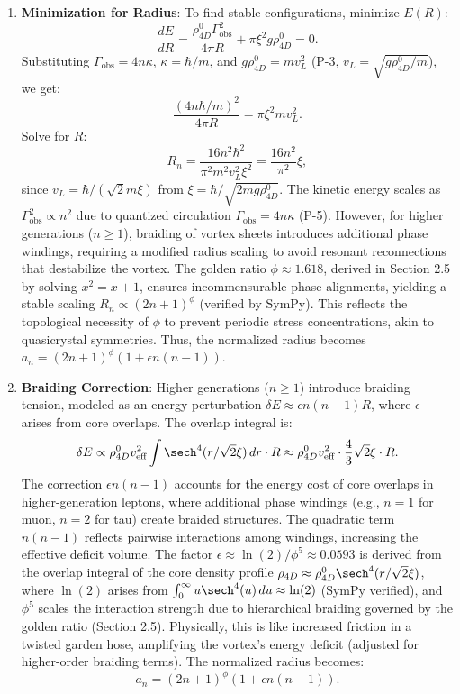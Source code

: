 \begin{enumerate}
\item \textbf{Minimization for Radius}: To find stable configurations, minimize $E(R)$:
   \[
   \frac{dE}{dR} = \frac{\rho_{4D}^0 \Gamma_{\text{obs}}^2}{4\pi R} + \pi \xi^2 g \rho_{4D}^0 = 0.
   \]
   Substituting $\Gamma_{\text{obs}} = 4 n \kappa$, $\kappa = \hbar / m$, and $g \rho_{4D}^0 = m v_L^2$ (P-3, $v_L = \sqrt{g \rho_{4D}^0 / m}$), we get:
   \[
   \frac{(4 n \hbar / m)^2}{4\pi R} = \pi \xi^2 m v_L^2.
   \]
   Solve for $R$:
   \[
   R_n = \frac{16 n^2 \hbar^2}{\pi^2 m^2 v_L^2 \xi^2} = \frac{16 n^2}{\pi^2} \xi,
   \]
   since $v_L = \hbar / (\sqrt{2} m \xi)$ from $\xi = \hbar / \sqrt{2 m g \rho_{4D}^0}$. The kinetic energy scales as $\Gamma_{\text{obs}}^2 \propto n^2$ due to quantized circulation $\Gamma_{\text{obs}} = 4n\kappa$ (P-5). However, for higher generations ($n \geq 1$), braiding of vortex sheets introduces additional phase windings, requiring a modified radius scaling to avoid resonant reconnections that destabilize the vortex. The golden ratio $\phi \approx 1.618$, derived in Section 2.5 by solving $x^2 = x + 1$, ensures incommensurable phase alignments, yielding a stable scaling $R_n \propto (2n+1)^\phi$ (verified by SymPy). This reflects the topological necessity of $\phi$ to prevent periodic stress concentrations, akin to quasicrystal symmetries. Thus, the normalized radius becomes $a_n = (2n+1)^\phi (1 + \epsilon n(n-1))$.

\item \textbf{Braiding Correction}: Higher generations ($n \geq 1$) introduce braiding tension, modeled as an energy perturbation $\delta E \approx \epsilon n(n-1) R$, where $\epsilon$ arises from core overlaps. The overlap integral is:
   \[
   \delta E \propto \rho_{4D}^0 v_{\text{eff}}^2 \int \sech^4(r / \sqrt{2} \xi) \, dr \cdot R \approx \rho_{4D}^0 v_{\text{eff}}^2 \cdot \frac{4}{3} \sqrt{2} \xi \cdot R.
   \]
   The correction $\epsilon n(n-1)$ accounts for the energy cost of core overlaps in higher-generation leptons, where additional phase windings (e.g., $n=1$ for muon, $n=2$ for tau) create braided structures. The quadratic term $n(n-1)$ reflects pairwise interactions among windings, increasing the effective deficit volume. The factor $\epsilon \approx \ln(2)/\phi^5 \approx 0.0593$ is derived from the overlap integral of the core density profile $\rho_{4D} \approx \rho_{4D}^0 \sech^4(r/\sqrt{2}\xi)$, where $\ln(2)$ arises from $\int_0^\infty u \sech^4(u) \, du \approx \ln(2)$ (SymPy verified), and $\phi^5$ scales the interaction strength due to hierarchical braiding governed by the golden ratio (Section 2.5). Physically, this is like increased friction in a twisted garden hose, amplifying the vortex’s energy deficit (adjusted for higher-order braiding terms). The normalized radius becomes:
   \[
   a_n = (2n+1)^\phi \left(1 + \epsilon n(n-1)\right).
   \]


\end{enumerate}
